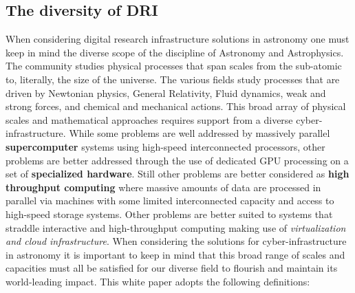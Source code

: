 \documentclass[11pt]{article}
\begin{document}
\subsection{The diversity of DRI}
When considering digital research infrastructure solutions in astronomy one must keep in mind the diverse scope of the discipline of Astronomy and Astrophysics. 
The community studies physical processes that span scales from the sub-atomic to, literally, the size of the universe.  
The various fields study processes that are driven by Newtonian physics, General Relativity, Fluid dynamics, weak and strong forces, and chemical and mechanical actions. 
This broad array of physical scales and mathematical approaches requires support from a diverse cyber-infrastructure.
While some problems are well addressed by massively parallel {\bf supercomputer} systems using high-speed interconnected processors, other problems are better addressed through the use of dedicated GPU processing on a set of {\bf specialized hardware}.  
Still other problems are better considered as {\bf high throughput computing} where massive amounts of data are processed in parallel via machines with some limited interconnected capacity and access to high-speed storage systems.  
Other problems are better suited to systems that straddle interactive and high-throughput computing making use of {\em virtualization and cloud infrastructure}.
When considering the solutions for cyber-infrastructure in astronomy it is important to keep in mind that this broad range of scales and capacities must all be satisfied for our diverse field to flourish and maintain its world-leading impact. This white paper adopts the following definitions:
\end{document}
